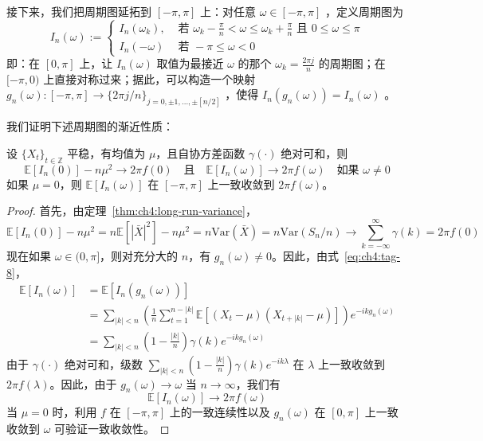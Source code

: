 接下来，我们把周期图延拓到 $[-\pi,\pi]$ 上：对任意 $\omega\in[-\pi,\pi]$ ，定义周期图为\[ I_n(\omega):=\begin{cases} I_n(\omega_k),&\text{ 若 }\omega_k-\frac\pi n<\omega\le \omega_k+\frac\pi n\text{ 且 }0\le\omega\le \pi\\ I_n(-\omega)&\text{ 若 }-\pi\le\omega<0 \end{cases} \]
即：在 $[0,\pi]$ 上，让 $I_n(\omega)$ 取值为最接近 $\omega$ 的那个 $\omega_k=\frac{2\pi j}{n}$ 的周期图；在 $[-\pi,0)$ 上直接对称过来；据此，可以构造一个映射 $g_n(\omega):[-\pi,\pi]\to \{2\pi j/n\}_{j=0,\pm1,\dots,\pm[n/2]}$ ，使得 $I_n(g_n(\omega))=I_n(\omega)$ 。

我们证明下述周期图的渐近性质：

\begin{theorem}[周期图的渐近无偏性]\label{thm:ch4:periodogram-expectation}

设 $\{X_t\}_{t\in\mathbb Z}$ 平稳，有均值为 $\mu$，且自协方差函数 $\gamma(\cdot)$ 绝对可和，则
\[\mathbb{E}[I_n(0)] - n\mu^2 \to 2\pi f(0) \quad \text{且} \quad \mathbb{E}[I_n(\omega)] \to 2\pi f(\omega) \quad \text{如果 } \omega \neq 0\]
如果 $\mu = 0$，则 $\mathbb{E}[I_n(\omega)]$ 在 $[-\pi, \pi]$ 上一致收敛到 $2\pi f(\omega)$。

\end{theorem}

\begin{proof}

首先，由定理~\ref{thm:ch4:long-run-variance}，
\[\mathbb{E}[I_n(0)] - n\mu^2 = n\mathbb{E}[|\bar{X}|^2] - n\mu^2 = n \mathrm{Var}(\bar{X}) = n \mathrm{Var}(S_n/n) \to \sum_{k=-\infty}^\infty \gamma(k) = 2\pi f(0)\]
现在如果 $\omega \in (0, \pi]$，则对充分大的 $n$，有 $g_n( \omega) \neq 0$。因此，由式~\eqref{eq:ch4:tag-8}，
\[\begin{aligned} \mathbb{E}[I_n(\omega)] &=\mathbb{E}[I_n(g_n(\omega))] \\ &=\sum_{|k|< n} \left(\frac1n\sum_{t = 1}^{n - |k|}\mathbb{E}[(X_{t} - \mu)(X_{t + |k|} - \mu)]\right)e^{-i k g_n(\omega)} \\ &= \sum_{|k|< n}\left(1 - \frac{|k|}{n}\right)\gamma (k)e^{-i k g_n(\omega)}  \end{aligned}\]
由于 $\gamma(\cdot)$ 绝对可和，级数 $\sum_{|k|< n}\left(1 - \frac{|k|}{n}\right)\gamma (k)e^{- i k\lambda}$ 在 $\lambda$ 上一致收敛到 $2\pi f(\lambda)$。因此，由于 $g_n(\omega) \to \omega$ 当 $n \to \infty$，我们有
\[\mathbb{E}[I_n(\omega)]\to 2\pi f(\omega)\]
当 $\mu = 0$ 时，利用 $f$ 在 $[-\pi,\pi]$ 上的一致连续性以及 $g_n(\omega)$ 在 $[0,\pi]$ 上一致收敛到 $\omega$ 可验证一致收敛性。

\end{proof}

